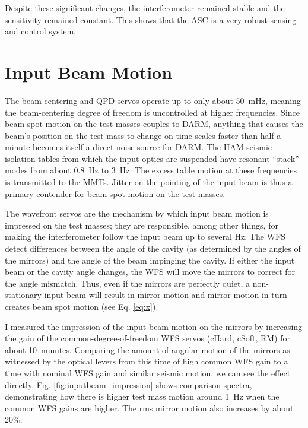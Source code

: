 Despite these significant changes, the interferometer remained stable
and the sensitivity remained constant. This shows that the ASC is a
very robust sensing and control system.


\section{Input Beam Motion}
The beam centering and QPD servos operate up to only about 50~mHz,
meaning the beam-centering degree of freedom is uncontrolled at higher
frequencies. Since beam spot motion on the test masses couples to
DARM, anything that causes the beam's position on the test mass to
change on time scales faster than half a minute becomes itself a
direct noise source for DARM. The HAM seismic isolation tables from
which the input optics are suspended have resonant ``stack'' modes
from about 0.8~Hz to 3~Hz. The excess table motion at these
frequencies is transmitted to the MMTs. Jitter on the pointing of the
input beam is thus a primary contender for beam spot motion on the
test masses.


The wavefront servos are the mechanism by which input beam motion is
impressed on the test masses; they are responsible, among other
things, for making the interferometer follow the input beam up to
several Hz. The WFS detect differences between the angle of the cavity
(as determined by the angles of the mirrors) and the angle of the beam
impinging the cavity. If either the input beam or the cavity angle
changes, the WFS will move the mirrors to correct for the angle
mismatch. Thus, even if the mirrors are perfectly quiet, a
non-stationary input beam will result in mirror motion and mirror
motion in turn creates beam spot motion (see Eq. \ref{eq:x}).

I measured the impression of the input beam motion on the mirrors by
increasing the gain of the common-degree-of-freedom WFS servos (cHard,
cSoft, RM) for about 10~minutes. Comparing the amount of angular motion
of the mirrors as witnessed by the optical levers from this time of
high common WFS gain to a time with nominal WFS gain and similar
seismic motion, we can see the effect
directly. Fig. \ref{fig:inputbeam_impression} shows comparison
spectra, demonstrating how there is higher test mass motion around
1~Hz when the common WFS gains are higher. The rms mirror motion also
increases by about 20\%.

